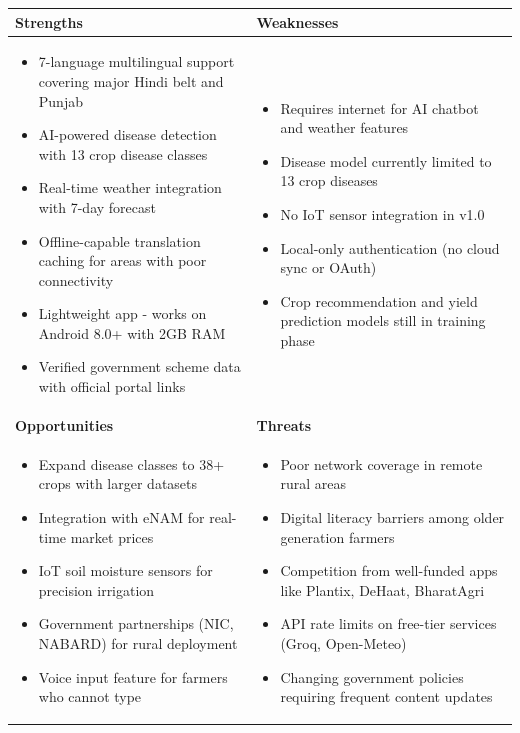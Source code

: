 \documentclass[12pt,a4paper]{article}
\newcommand{\tablefont}{\fontsize{10}{12}\selectfont}
\begin{document}
{\tablefont
\begin{tabular}{|p{6cm}|p{6cm}|}
\hline
\textbf{Strengths} & \textbf{Weaknesses} \\
\hline
\begin{itemize}[leftmargin=*, nosep]
    \item 7-language multilingual support covering major Hindi belt and Punjab
    \item AI-powered disease detection with 13 crop disease classes
    \item Real-time weather integration with 7-day forecast
    \item Offline-capable translation caching for areas with poor connectivity
    \item Lightweight app - works on Android 8.0+ with 2GB RAM
    \item Verified government scheme data with official portal links
\end{itemize}
&
\begin{itemize}[leftmargin=*, nosep]
    \item Requires internet for AI chatbot and weather features
    \item Disease model currently limited to 13 crop diseases
    \item No IoT sensor integration in v1.0
    \item Local-only authentication (no cloud sync or OAuth)
    \item Crop recommendation and yield prediction models still in training phase
\end{itemize}
\\
\hline
\textbf{Opportunities} & \textbf{Threats} \\
\hline
\begin{itemize}[leftmargin=*, nosep]
    \item Expand disease classes to 38+ crops with larger datasets
    \item Integration with eNAM for real-time market prices
    \item IoT soil moisture sensors for precision irrigation
    \item Government partnerships (NIC, NABARD) for rural deployment
    \item Voice input feature for farmers who cannot type
\end{itemize}
&
\begin{itemize}[leftmargin=*, nosep]
    \item Poor network coverage in remote rural areas
    \item Digital literacy barriers among older generation farmers
    \item Competition from well-funded apps like Plantix, DeHaat, BharatAgri
    \item API rate limits on free-tier services (Groq, Open-Meteo)
    \item Changing government policies requiring frequent content updates
\end{itemize}
\\
\hline
\end{tabular}
}
\end{document}
